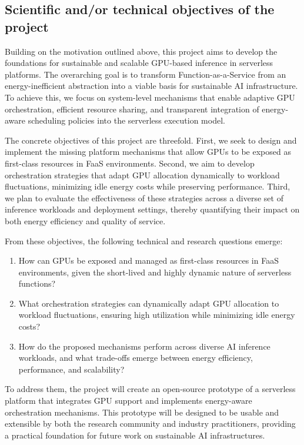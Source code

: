 \subsection{Scientific and/or technical objectives of the project}

Building on the motivation outlined above, this project aims to develop the foundations for sustainable and scalable GPU-based inference in serverless platforms. The overarching goal is to transform Function-as-a-Service from an energy-inefficient abstraction into a viable basis for sustainable AI infrastructure. To achieve this, we focus on system-level mechanisms that enable adaptive GPU orchestration, efficient resource sharing, and transparent integration of energy-aware scheduling policies into the serverless execution model.

The concrete objectives of this project are threefold. First, we seek to design and implement the missing platform mechanisms that allow GPUs to be exposed as first-class resources in FaaS environments. Second, we aim to develop orchestration strategies that adapt GPU allocation dynamically to workload fluctuations, minimizing idle energy costs while preserving performance. Third, we plan to evaluate the effectiveness of these strategies across a diverse set of inference workloads and deployment settings, thereby quantifying their impact on both energy efficiency and quality of service.

From these objectives, the following technical and research questions emerge:
\begin{enumerate}
    \item How can GPUs be exposed and managed as first-class resources in FaaS environments, given the short-lived and highly dynamic nature of serverless functions? %
    \item What orchestration strategies can dynamically adapt GPU allocation to workload fluctuations, ensuring high utilization while minimizing idle energy costs? %
    \item How do the proposed mechanisms perform across diverse AI inference workloads, and what trade-offs emerge between energy efficiency, performance, and scalability? %
\end{enumerate}

To address them, the project will create an open-source prototype of a serverless platform that integrates GPU support and implements energy-aware orchestration mechanisms.
This prototype will be designed to be usable and extensible by both the research community and industry practitioners, providing a practical foundation for future work on sustainable AI infrastructures.


